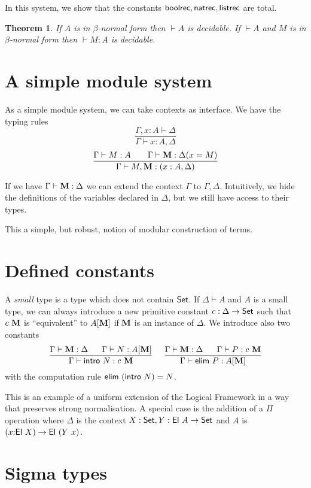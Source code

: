 \documentclass[11pt]{article}
\newtheorem{theorem}{Theorem}[section]
\def\SET{\hbox{\sf Set}}
\def\EL{\hbox{\sf El}}
\def\INTRO{\hbox{\sf intro}}
\def\ELIM{\hbox{\sf elim}}
\def\NATREC{\hbox{\sf natrec}}
\def\BOOLREC{\hbox{\sf boolrec}}
\def\LISTREC{\hbox{\sf listrec}}
\begin{document}
 In this system, we show that the constants $\BOOLREC,\NATREC,\LISTREC$ are total.

\begin{theorem}
If $A$ is in $\beta$-normal form then $\vdash A$ is decidable. If $\vdash A$ and $M$ is
in $\beta$-normal form then $\vdash M:A$ is decidable.
\end{theorem}

\section{A simple module system}

 As a simple module system, we can take contexts as interface. We have the typing rules
$$
\frac{\Gamma,x:A\vdash\Delta}{\Gamma\vdash x:A,\Delta}
$$
$$
\frac{\Gamma\vdash M:A~~~~~~\Gamma\vdash {\bf M}:\Delta(x=M)}
     {\Gamma\vdash M,{\bf M}:(x:A,\Delta)}
$$

 If we have $\Gamma\vdash {\bf M}:\Delta$ we can extend the context $\Gamma$ to
$\Gamma,\Delta$. Intuitively, we hide the definitions of the variables declared
in $\Delta$, but we still have access to their types.

 This a simple, but robust, notion of modular construction of terms.

\section{Defined constants}

 A {\em small} type is a type which does not contain $\SET$. If $\Delta\vdash A$
and $A$ is a small type, we can always introduce a new primitive constant
$c:\Delta\rightarrow\SET$ such that $c~{\bf M}$  is ``equivalent'' to $A[{\bf M}]$ if
${\bf M}$ is an instance of $\Delta$. We introduce also two constants
$$
\frac{\Gamma\vdash {\bf M}:\Delta~~~~~\Gamma\vdash N:A[{\bf M}]}{\Gamma\vdash \INTRO~N:c~{\bf M}}~~~~
\frac{\Gamma\vdash {\bf M}:\Delta~~~~~\Gamma\vdash P:c~{\bf M}}{\Gamma\vdash \ELIM~P:A[{\bf M}]}
$$
with the computation rule $\ELIM~(\INTRO~N) = N$.

 This is an example of a uniform extension of the Logical Framework in a way that 
preserves strong normalisation. A special case is the addition of a $\Pi$ operation
where $\Delta$
is the context $X:\SET,Y:\EL~A\rightarrow\SET$ and $A$ is $(x{:}\EL~X)\rightarrow\EL~(Y~x)$.

\section{Sigma types}
\end{document}
